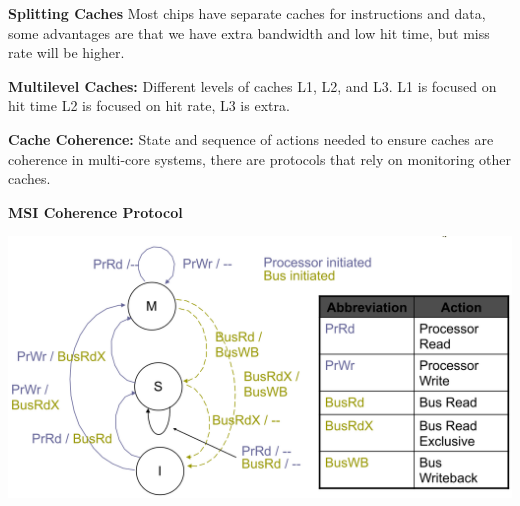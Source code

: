 \textbf{Splitting Caches} Most chips have separate caches for instructions and
data, some advantages are that we have extra bandwidth and low hit time, but miss
rate will be higher.

\textbf{Multilevel Caches:} Different levels of caches L1, L2, and L3. L1 is focused
on hit time L2 is focused on hit rate, L3 is extra.

\textbf{Cache Coherence:} State and sequence of actions needed to ensure caches
are coherence in multi-core systems, there are protocols that rely on monitoring
other caches.

\textbf{MSI Coherence Protocol}

\includegraphics[width=\linewidth]{png/msi.png}
